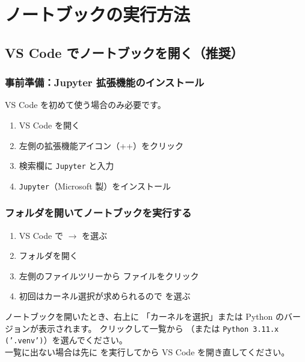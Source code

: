 \chapter{ノートブックの実行方法}

\section{VS Code でノートブックを開く（推奨）}

\subsection{事前準備：Jupyter 拡張機能のインストール}

VS Code を初めて使う場合のみ必要です。

\begin{enumerate}
  \item VS Code を開く
  \item 左側の拡張機能アイコン（++）をクリック
  \item 検索欄に \texttt{Jupyter} と入力
  \item \texttt{Jupyter}（Microsoft 製）をインストール
\end{enumerate}

\subsection{フォルダを開いてノートブックを実行する}

\begin{enumerate}
  \item VS Code で  $\rightarrow$  を選ぶ
  \item {} フォルダを開く
  \item 左側のファイルツリーから  ファイルをクリック
  \item 初回はカーネル選択が求められるので
     を選ぶ
\end{enumerate}

\begin{notebox}[カーネルの選び方]
ノートブックを開いたとき、右上に
「カーネルを選択」または Python のバージョンが表示されます。
クリックして一覧から （または
\texttt{Python 3.11.x ('.venv')}）を選んでください。\\[0.5em]
一覧に出ない場合は先に  を実行してから
VS Code を開き直してください。
\end{notebox}

